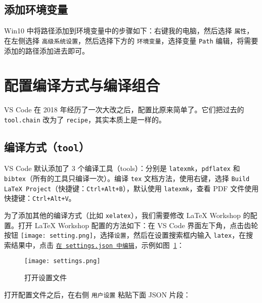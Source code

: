\documentclass{article}
\begin{document}
\subsection{添加环境变量}
Win10 中将路径添加到环境变量中的步骤如下：右键我的电脑，然后选择 \texttt{属性}，在左侧选择 \texttt{高级系统设置}，然后选择下方的 \texttt{环境变量}，选择变量 \texttt{Path} 编辑，将需要添加的路径添加进去即可。

\section{配置编译方式与编译组合}
VS Code 在 2018 年经历了一次大改之后，配置比原来简单了。它们把过去的 \texttt{tool.chain} 改为了 \texttt{recipe}，其实本质上是一样的。

\subsection{编译方式（\texttt{tool}）}
VS Code 默认添加了 3 个编译工具（tools）：分别是 \texttt{latexmk}，\texttt{pdflatex} 和 \texttt{bibtex}（所有的工具只编译一次）。编译 \texttt{tex} 文档方法，使用右键，选择 \texttt{Build LaTeX Project}（快捷键：\texttt{Ctrl+Alt+B}），默认使用 \texttt{latexmk}，查看 PDF 文件使用快捷键：\texttt{Ctrl+Alt+V}。

为了添加其他的编译方式（比如 \texttt{xelatex}），我们需要修改 \LaTeX{} Workshop 的配置。打开 LaTeX Workshop 配置的方法如下：在 VS Code 界面左下角，点击齿轮按钮 \texttt{[image: setting.png]}，选择\texttt{设置}，然后在设置搜索框内输入 \texttt{latex}，在搜索结果中，点击 \underline{\texttt{在 settings.json 中编辑}}，示例如图~\ref{fig:settings}：

\begin{figure}[!htbp]
  \centering
  \texttt{[image: settings.png]}
  \caption{打开设置文件\label{fig:settings}}
\end{figure}


打开配置文件之后，在右侧 \texttt{用户设置} 粘贴下面 JSON 片段：
\end{document}
